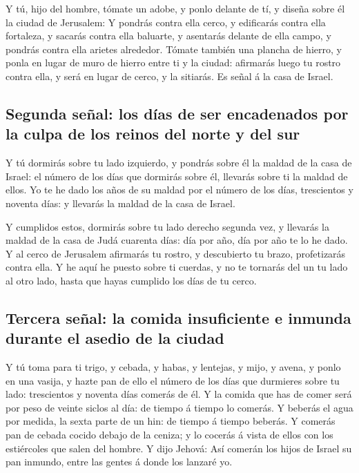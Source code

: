  Y tú, hijo del hombre, tómate un adobe, y ponlo delante
de tí, y diseña sobre él la ciudad de Jerusalem:  Y
pondrás contra ella cerco, y edificarás contra ella fortaleza, y sacarás
contra ella baluarte, y asentarás delante de ella campo, y pondrás
contra ella arietes alrededor.  Tómate también una plancha
de hierro, y ponla en lugar de muro de hierro entre ti y la ciudad:
afirmarás luego tu rostro contra ella, y será en lugar de cerco, y la
sitiarás. Es señal á la casa de Israel.

\hypertarget{segunda-seuxf1al-los-duxedas-de-ser-encadenados-por-la-culpa-de-los-reinos-del-norte-y-del-sur}{%
\subsection{Segunda señal: los días de ser encadenados por la culpa de
los reinos del norte y del
sur}\label{segunda-seuxf1al-los-duxedas-de-ser-encadenados-por-la-culpa-de-los-reinos-del-norte-y-del-sur}}

 Y tú dormirás sobre tu lado izquierdo, y pondrás sobre él
la maldad de la casa de Israel: el número de los días que dormirás sobre
él, llevarás sobre ti la maldad de ellos.  Yo te he dado
los años de su maldad por el número de los días, trescientos y noventa
días: y llevarás la maldad de la casa de Israel.

 Y cumplidos estos, dormirás sobre tu lado derecho segunda
vez, y llevarás la maldad de la casa de Judá cuarenta días: día por año,
día por año te lo he dado.  Y al cerco de Jerusalem
afirmarás tu rostro, y descubierto tu brazo, profetizarás contra ella.
 Y he aquí he puesto sobre ti cuerdas, y no te tornarás
del un tu lado al otro lado, hasta que hayas cumplido los días de tu
cerco.

\hypertarget{tercera-seuxf1al-la-comida-insuficiente-e-inmunda-durante-el-asedio-de-la-ciudad}{%
\subsection{Tercera señal: la comida insuficiente e inmunda durante el
asedio de la
ciudad}\label{tercera-seuxf1al-la-comida-insuficiente-e-inmunda-durante-el-asedio-de-la-ciudad}}

 Y tú toma para ti trigo, y cebada, y habas, y lentejas, y
mijo, y avena, y ponlo en una vasija, y hazte pan de ello el número de
los días que durmieres sobre tu lado: trescientos y noventa días comerás
de él.  Y la comida que has de comer será por peso de
veinte siclos al día: de tiempo á tiempo lo comerás.  Y
beberás el agua por medida, la sexta parte de un hin: de tiempo á tiempo
beberás.  Y comerás pan de cebada cocido debajo de la
ceniza; y lo cocerás á vista de ellos con los estiércoles que salen del
hombre.  Y dijo Jehová: Así comerán los hijos de Israel
su pan inmundo, entre las gentes á donde los lanzaré yo.

